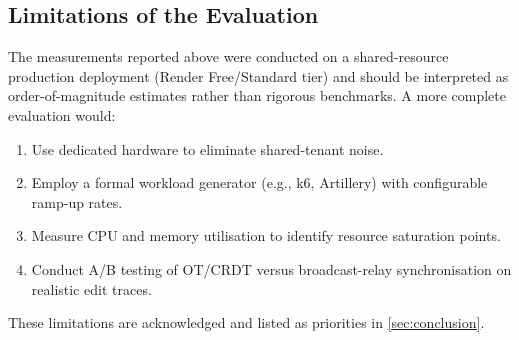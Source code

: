 \subsection{Limitations of the Evaluation}

The measurements reported above were conducted on a shared-resource
production deployment (Render Free/Standard tier) and should be interpreted
as order-of-magnitude estimates rather than rigorous benchmarks. A more
complete evaluation would:

\begin{enumerate}[leftmargin=*, label=(\roman*)]
  \item Use dedicated hardware to eliminate shared-tenant noise.
  \item Employ a formal workload generator (e.g., k6, Artillery) with
    configurable ramp-up rates.
  \item Measure CPU and memory utilisation to identify resource saturation
    points.
  \item Conduct A/B testing of OT/CRDT versus broadcast-relay synchronisation
    on realistic edit traces.
\end{enumerate}

These limitations are acknowledged and listed as priorities in
\cref{sec:conclusion}.
